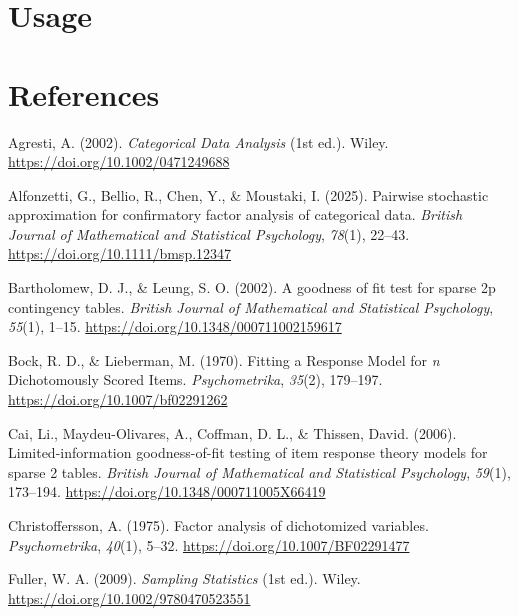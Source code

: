 \documentclass[
  letterpaper,
  DIV=11,
  numbers=noendperiod]{scrartcl}
\newlength{\cslhangindent}
\newenvironment{CSLReferences}[2] %
 {\begin{list}{}{%
  \setlength{\itemindent}{0pt}
  \setlength{\leftmargin}{0pt}
  \setlength{\parsep}{0pt}
  \ifodd #1
   \setlength{\leftmargin}{\cslhangindent}
   \setlength{\itemindent}{-1\cslhangindent}
  \fi
  \setlength{\itemsep}{#2\baselineskip}}}
 {\end{list}}
\begin{document}
\section{Usage}\label{usage}

\section*{References}\label{references}

\label{refs}
\begin{CSLReferences}{1}{0}
Agresti, A. (2002). \emph{Categorical {Data Analysis}} (1st ed.). Wiley.
\url{https://doi.org/10.1002/0471249688}

Alfonzetti, G., Bellio, R., Chen, Y., \& Moustaki, I. (2025). Pairwise
stochastic approximation for confirmatory factor analysis of categorical
data. \emph{British Journal of Mathematical and Statistical Psychology},
\emph{78}(1), 22--43. \url{https://doi.org/10.1111/bmsp.12347}

Bartholomew, D. J., \& Leung, S. O. (2002). A goodness of fit test for
sparse 2p contingency tables. \emph{British Journal of Mathematical and
Statistical Psychology}, \emph{55}(1), 1--15.
\url{https://doi.org/10.1348/000711002159617}

Bock, R. D., \& Lieberman, M. (1970). Fitting a {Response Model} for
{\emph{n}} {Dichotomously Scored Items}. \emph{Psychometrika},
\emph{35}(2), 179--197. \url{https://doi.org/10.1007/bf02291262}

Cai, Li., Maydeu-Olivares, A., Coffman, D. L., \& Thissen, David.
(2006). Limited-information goodness-of-fit testing of item response
theory models for sparse 2 tables. \emph{British Journal of Mathematical
and Statistical Psychology}, \emph{59}(1), 173--194.
\url{https://doi.org/10.1348/000711005X66419}

Christoffersson, A. (1975). Factor analysis of dichotomized variables.
\emph{Psychometrika}, \emph{40}(1), 5--32.
\url{https://doi.org/10.1007/BF02291477}

Fuller, W. A. (2009). \emph{Sampling {Statistics}} (1st ed.). Wiley.
\url{https://doi.org/10.1002/9780470523551}


\end{CSLReferences}
\end{document}
